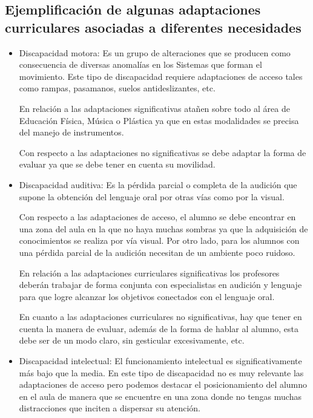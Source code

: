 \subsection{Ejemplificación de algunas adaptaciones curriculares asociadas a diferentes necesidades }

\begin{itemize}
    \item Discapacidad motora: Es un grupo de alteraciones que se producen como consecuencia de diversas anomalías en los Sistemas que forman el movimiento. Este tipo de discapacidad requiere  adaptaciones de acceso tales como rampas, pasamanos, suelos antideslizantes, etc. 
    
    En relación a las adaptaciones significativas atañen sobre todo al área de Educación Física, Música o Plástica ya que en estas modalidades se precisa del manejo de instrumentos. 

    Con respecto a las adaptaciones no significativas se debe adaptar la forma de evaluar ya que se debe tener en cuenta su movilidad. 
    
    \item Discapacidad auditiva: Es la pérdida parcial o completa de la audición que supone la obtención del lenguaje oral por otras vías como por la visual. 
    
    Con respecto a las adaptaciones de acceso, el alumno se debe encontrar en una zona del aula en la que no haya muchas sombras ya que la adquisición de conocimientos se realiza por vía visual. Por otro lado, para los alumnos con una pérdida parcial de la audición necesitan de un ambiente poco ruidoso. 
    
    En relación a las adaptaciones curriculares significativas los profesores deberán trabajar de forma conjunta con especialistas en audición y lenguaje para que logre alcanzar los objetivos conectados con el lenguaje oral.

    En cuanto a las adaptaciones curriculares no significativas, hay que tener en cuenta la manera de evaluar, además de la forma de hablar al alumno, esta debe ser de un modo claro, sin gesticular excesivamente, etc.
    
    \item Discapacidad intelectual: El funcionamiento intelectual es significativamente más bajo que la media. En este tipo de discapacidad no es muy relevante las adaptaciones de acceso pero podemos destacar el posicionamiento del alumno en el aula de manera que se encuentre en una zona donde no tengas muchas distracciones  que inciten a dispersar su atención.
    

\end{itemize}
